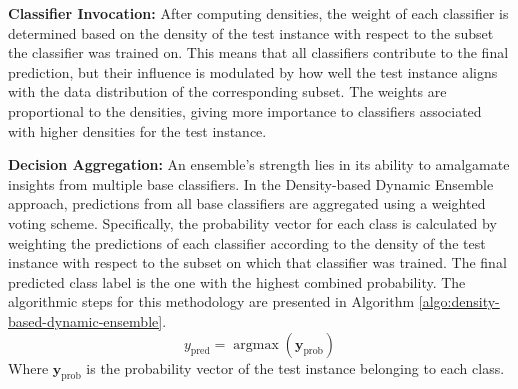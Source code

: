 \documentclass[lettersize,journal]{IEEEtran}
\begin{document}
	\textbf{Classifier Invocation:} After computing densities, the weight of each classifier is determined based on the density of the test instance with respect to the subset the classifier was trained on. This means that all classifiers contribute to the final prediction, but their influence is modulated by how well the test instance aligns with the data distribution of the corresponding subset. The weights are proportional to the densities, giving more importance to classifiers associated with higher densities for the test instance.
	
	\textbf{Decision Aggregation:} An ensemble's strength lies in its ability to amalgamate insights from multiple base classifiers. In the Density-based Dynamic Ensemble approach, predictions from all base classifiers are aggregated using a weighted voting scheme. Specifically, the probability vector for each class is calculated by weighting the predictions of each classifier according to the density of the test instance with respect to the subset on which that classifier was trained. The final predicted class label is the one with the highest combined probability. The algorithmic steps for this methodology are presented in Algorithm \ref{algo:density-based-dynamic-ensemble}.
	\begin{equation}
		y_{\text{pred}} = \operatorname{argmax}\left(\mathbf{y}_{\text{prob}}\right)
	\end{equation}
	Where $\mathbf{y}_{\text{prob}}$ is the probability vector of the test instance belonging to each class.
	
\end{document}
